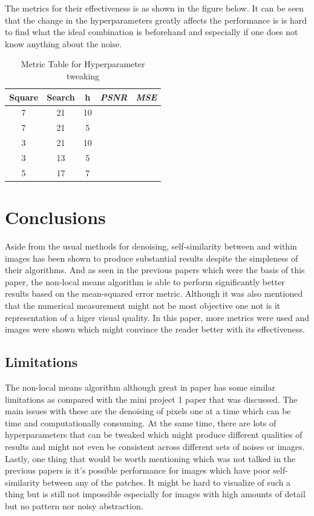 \documentclass[conference]{IEEEtran}
\begin{document}
The metrics for their effectiveness is as shown in the figure below. It can be seen that the change in the hyperparameters greatly affects the performance is is hard to find 
what the ideal combination is beforehand and especially if one does not know anything about the noise.
    \begin{table}[htbp]
        \caption{Metric Table for Hyperparameter tweaking}
        \begin{center}
        \begin{tabular}{|c|c|c|c|c|}
        \hline
        \textbf{Square} & \textbf{Search} & \textbf{h} & \textbf{\textit{PSNR}} & \textbf{\textit{MSE}} \\
        \hline
        7 & 21 & 10 & & \\
        \hline
        7 & 21 & 5 & & \\
        \hline
        3 & 21 & 10 & &  \\
        \hline
        3 & 13 & 5 & & \\
        \hline
        5 & 17 & 7 & & \\
        \hline
        \end{tabular}
        \label{tab1}
        \end{center}
    \end{table}

\section{Conclusions}
    Aside from the usual methods for denoising, self-similarity between and within images has been shown to produce substantial results despite the simpleness of their algorithms.
    And as seen in the previous papers which were the basis of this paper, the non-local means algorithm is able to perform significantly better results based on the mean-squared error metric.
    Although it was also mentioned that the numerical measurement might not be most objective one not is it representation of a higer visual quality. In this paper, more metrics were used and images were shown which
    might convince the reader better with its effectiveness.

    \subsection{Limitations}
    The non-local means algorithm although great in paper has some similar limitations as compared with the mini project 1 paper that was discussed. The main issues with these are the denoising of pixels one at a time which
    can be time and computationally consuming. At the same time, there are lots of hyperparameters that can be tweaked which might produce different qualities of results and might not even be consistent across different sets of noises or images. 
    Lastly, one thing that would be worth mentioning which was not talked in the previous papers is it's possible performance for images which have poor self-similarity between any of the patches. It might be hard to visualize of such a thing but 
    is still not impossible especially for images with high amounts of detail but no pattern nor noisy abstraction.
\end{document}
